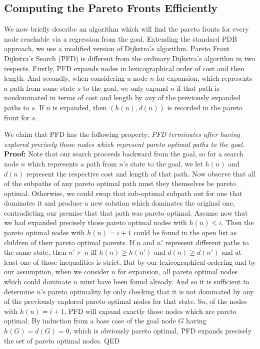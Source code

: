 \documentclass[letterpaper]{article} %
\begin{document}
\subsection{Computing the Pareto Fronts Efficiently}

We now briefly describe an algorithm which
will find the pareto fronts for every node reachable
via a regression from the goal. Extending
the standard PDB approach, we use a modified
version of Dijkstra's  algorithm.
Pareto Front Dijkstra's Search (PFD) is different from
the ordinary Dijkstra's algorithm in two respects.
Firstly, PFD expands nodes in lexicographical order of cost and then length.
And secondly, when considering a node \(n\) for expansion,
which represents a path from some state \(s\) to the goal,
we only expand \(n\) if that path is nondominated in terms of cost and length
by any of the previously expanded paths to \(s\).
If \(n\) is expanded, then \((h(n), d(n))\) is recorded in
the pareto front for \(s\).

We claim that PFD has the following property:
\textit{PFD terminates after having explored precisely those nodes
  which represent pareto optimal paths to the goal.} \\
\textbf{Proof:}
Note that our search proceeds backward from the goal, so for a search node \(n\)
which represents a path from \(n\)'s state to the goal, we let \(h(n)\) and \(d(n)\)
represent the respective cost and length of that path.
Now observe that all of the subpaths of any pareto optimal path must they themselves
be pareto optimal. Otherwise, we could swap that sub-optimal subpath out for
one that dominates it and produce a new solution which dominates the original one, contradicting our premise
that that path was pareto optimal.
Assume now that we had expanded precisely those pareto optimal nodes with \(h(n) \leq i\).
Then the pareto optimal nodes with \(h(n) = i + 1\) could be found in the open list
as children of their pareto optimal parents.
If \(n\) and \(n'\) represent different paths to the same state,
then \(n' \succ n\) iff \(h(n) \geq h(n')\) and \(d(n) \geq d(n')\)
and at least one of those inequalities is strict.
But by our lexicographical ordering and by our assumption,
when we consider \(n\) for expansion,
all pareto optimal nodes which could dominate \(n\) must have been found already.
And so it is sufficient to determine \(n\)'s pareto optimality by only checking
that it is not dominated by any of the previously explored pareto optimal nodes for that state.
So, of the nodes with \(h(n) = i + 1\), PFD will expand exactly those nodes which
are pareto optimal. By induction from a base case of the goal node \(G\) having \(h(G) = d(G) = 0\), which is obviously
pareto optimal, PFD expands precisely the set of pareto optimal nodes. QED
\end{document}
